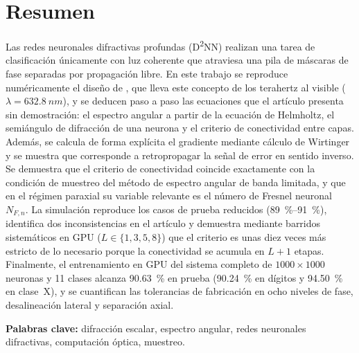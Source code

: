 \chapter*{Resumen}

Las redes neuronales difractivas profundas (D\textsuperscript{2}NN) realizan una tarea de
clasificación únicamente con luz coherente que atraviesa una pila de máscaras de fase
separadas por propagación libre. En este trabajo se reproduce numéricamente el diseño de
\textcite{chen2021}, que lleva este concepto de los terahertz al visible
($\lambda=\SI{632.8}{nm}$), y se deducen paso a paso las ecuaciones que el artículo
presenta sin demostración: el espectro angular a partir de la ecuación de Helmholtz, el
semiángulo de difracción de una neurona y el criterio de conectividad entre capas.
Además, se calcula de forma explícita el gradiente mediante cálculo de Wirtinger y se
muestra que corresponde a retropropagar la señal de error en sentido inverso. Se demuestra que
el criterio de conectividad coincide exactamente con la condición de muestreo
del método de espectro angular de banda limitada, y que en el régimen paraxial su variable
relevante es el número de Fresnel neuronal $N_{F,n}$. La simulación reproduce los casos de
prueba reducidos (\SIrange{89}{91}{\percent}), identifica dos inconsistencias en el artículo y
demuestra mediante barridos sistemáticos en GPU ($L\in\{1,3,5,8\}$) que el criterio es unas
diez veces más estricto de lo necesario porque la conectividad se acumula en $L+1$ etapas.
Finalmente, el entrenamiento en GPU del sistema completo de $1000\times1000$ neuronas y
11 clases alcanza \SI{90.63}{\percent} en prueba (\SI{90.24}{\percent} en dígitos y
\SI{94.50}{\percent} en clase~X), y se cuantifican las tolerancias de fabricación en ocho
niveles de fase, desalineación lateral y separación axial.

\medskip\noindent\textbf{Palabras clave:} difracción escalar, espectro angular, redes
neuronales difractivas, computación óptica, muestreo.

